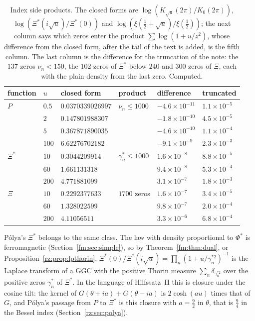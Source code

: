 \begin{table}[htbp]
\centering\small
\begin{tabular}{llllll}
\toprule
function & $u$ & closed form & product & difference & truncated\\
\midrule
$P$ & $0.5$ & $0.0370339026997$ & $\nu_n\le1000$ & $-4.6\times10^{-11}$ & $1.1\times10^{-5}$\\
 & $2$ & $0.147801988307$ & & $-1.8\times10^{-10}$ & $4.5\times10^{-5}$\\
 & $5$ & $0.367871890035$ & & $-4.6\times10^{-10}$ & $1.1\times10^{-4}$\\
 & $100$ & $6.62276702182$ & & $-9.1\times10^{-9}$ & $2.3\times10^{-3}$\\
$\Xi^*$ & $10$ & $0.3044209914$ & $\gamma^*_n\le1000$ & $1.6\times10^{-8}$ & $8.8\times10^{-5}$\\
 & $60$ & $1.661131318$ & & $9.4\times10^{-8}$ & $5.3\times10^{-4}$\\
 & $200$ & $4.771881099$ & & $3.1\times10^{-7}$ & $1.8\times10^{-3}$\\
$\Xi$ & $10$ & $0.2292377633$ & $1700$ zeros & $1.6\times10^{-7}$ & $3.4\times10^{-5}$\\
 & $60$ & $1.328022599$ & & $9.8\times10^{-7}$ & $2.0\times10^{-4}$\\
 & $200$ & $4.11056511$ & & $3.3\times10^{-6}$ & $6.8\times10^{-4}$\\
\bottomrule
\end{tabular}
\caption[Index side products for $P$, $\Xi^*$ and $\Xi$]{Index side products. The closed forms are $\log(K_{\sqrt u}(2\pi)/K_0(2\pi))$, $\log(\Xi^*(i\sqrt u)/\Xi^*(0))$ and $\log(\xi(\frac12+\sqrt u)/\xi(\frac12))$; the next column says which zeros enter the product $\sum\log(1+u/z^2)$, whose difference from the closed form, after the tail of the text is added, is the fifth column. The last column is the difference for the truncation of the note: the $137$ zeros $\nu_n<150$, the $102$ zeros of $\Xi^*$ below $240$ and $300$ zeros of $\Xi$, each with the plain density from the last zero. Computed.}
\label{tab:biane:products}
\end{table}

P\'olya's $\Xi^*$ belongs to the same class. The law with density proportional to $\Phi^*$ is ferromagnetic (Section~\ref{fm:sec:simple}), so by Theorem~\ref{fm:thm:dual}, or Proposition~\ref{rz:prop:lpthorin}, $\Xi^*(0)/\Xi^*(i\sqrt u)=\prod_n(1+u/\gamma_n^{*2})^{-1}$ is the Laplace transform of a GGC with the positive Thorin measure $\sum_n\delta_{\gamma_n^{*2}}$ over the positive zeros $\gamma^*_n$ of $\Xi^*$. In the language of Hilfssatz~II this is closure under the cosine tilt: the kernel of $G(\theta+ia)+G(\theta-ia)$ is $2\cosh(au)$ times that of $G$, and P\'olya's passage from $P$ to $\Xi^*$ is this closure with $a=\frac92$ in $\theta$, that is $\frac94$ in the Bessel index (Section~\ref{rz:sec:polya}).

